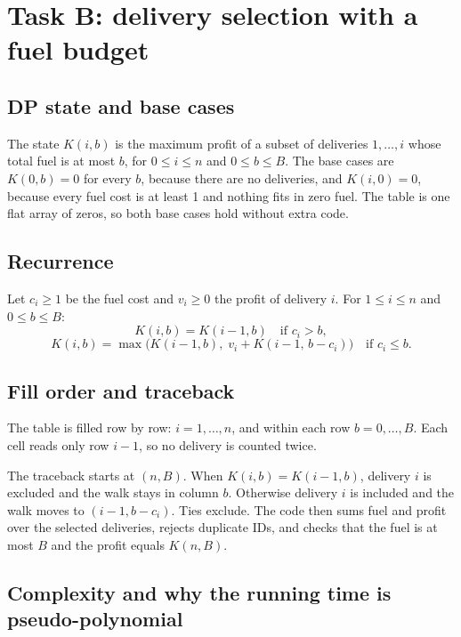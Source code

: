 \documentclass[11pt]{article}
\begin{document}
\section{Task B: delivery selection with a fuel budget}

\subsection{DP state and base cases}

The state $K(i,b)$ is the maximum profit of a subset of deliveries $1, \ldots, i$ whose total fuel
is at most $b$, for $0 \le i \le n$ and $0 \le b \le B$. The base cases are $K(0,b) = 0$ for every
$b$, because there are no deliveries, and $K(i,0) = 0$, because every fuel cost is at least 1 and
nothing fits in zero fuel. The table is one flat array of zeros, so both base cases hold without
extra code.

\subsection{Recurrence}

Let $c_i \ge 1$ be the fuel cost and $v_i \ge 0$ the profit of delivery $i$. For $1 \le i \le n$
and $0 \le b \le B$:
\[
K(i,b) = K(i-1,b) \quad \mbox{if } c_i > b,
\]
\[
K(i,b) = \max\bigl( K(i-1,b),\; v_i + K(i-1,\, b - c_i) \bigr) \quad \mbox{if } c_i \le b.
\]

\subsection{Fill order and traceback}

The table is filled row by row: $i = 1, \ldots, n$, and within each row $b = 0, \ldots, B$. Each
cell reads only row $i-1$, so no delivery is counted twice.

The traceback starts at $(n, B)$. When $K(i,b) = K(i-1,b)$, delivery $i$ is excluded and the walk
stays in column $b$. Otherwise delivery $i$ is included and the walk moves to $(i-1, b - c_i)$. Ties
exclude. The code then sums fuel and profit over the selected deliveries, rejects duplicate IDs,
and checks that the fuel is at most $B$ and the profit equals $K(n,B)$.

\subsection{Complexity and why the running time is pseudo-polynomial}
\end{document}
